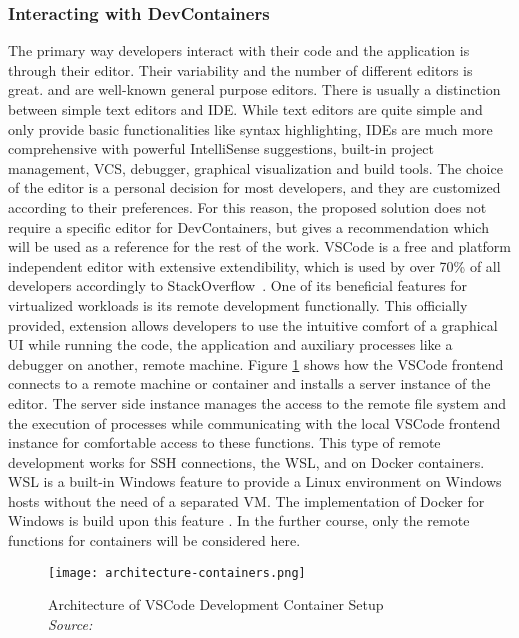         \subsubsection{Interacting with DevContainers}
        The primary way developers interact with their code and the application is through their editor. Their variability and the number of different editors is great.  and  are well-known general purpose editors. There is usually a distinction between simple text editors and \acl{IDE}. While text editors are quite simple and only provide basic functionalities like syntax highlighting, \ac{IDE}s are much more comprehensive with powerful IntelliSense suggestions, built-in project management, \ac{VCS}, debugger, graphical visualization and build tools. The choice of the editor is a personal decision for most developers, and they are customized according to their preferences. For this reason, the proposed solution does not require a specific editor for DevContainers, but gives a recommendation which will be used as a reference for the rest of the work.\newline
        \ac{VSCode} is a free and platform independent editor with extensive extendibility, which is used by over 70\% of all developers accordingly to StackOverflow~\cite{stackoverflow2021}. One of its beneficial features for virtualized workloads is its remote development functionally. This officially provided, extension allows developers to use the intuitive comfort of a graphical \ac{UI} while running the code, the application and auxiliary processes like a debugger on another, remote machine. Figure \ref{fig::vscodecontainer} shows how the \ac{VSCode} frontend connects to a remote machine or container and installs a server instance of the editor. The server side instance manages the access to the remote file system and the execution of processes while communicating with the local \ac{VSCode} frontend instance for comfortable access to these functions. This type of remote development works for \ac{SSH} connections, the \ac{WSL}, and on Docker containers. \ac{WSL} is a built-in Windows feature to provide a Linux environment on Windows hosts without the need of a separated \ac{VM}. The implementation of Docker for Windows is build upon this feature \cite{vscodedevcontainer}. In the further course, only the remote functions for containers will be considered here.
        \begin{figure}[]
            \centering
            \texttt{[image: architecture-containers.png]}
            \caption{Architecture of \ac{VSCode} Development Container Setup \\\textit{Source:~\cite{vscodedevcontainer}}}\label{fig::vscodecontainer}
        \end{figure}
